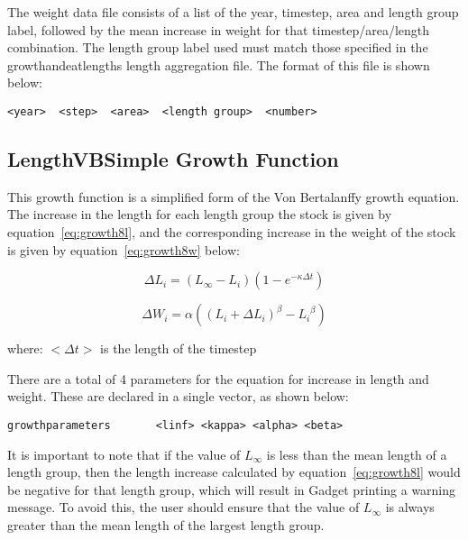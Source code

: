 \documentclass[10pt,twoside]{book}
\begin{document}
The weight data file consists of a list of the year, timestep, area  and length group label, followed by the mean increase in weight for that timestep/area/length combination.  The length group label used must match those specified in the growthandeatlengths length aggregation file.  The format of this file is shown below:

{\small\begin{verbatim}
<year>  <step>  <area>  <length group>  <number>
\end{verbatim}}

\subsection{LengthVBSimple Growth Function}\label{subsec:growth8}
This growth function is a simplified form of the Von Bertalanffy growth equation.  The increase in the length for each length group the stock is given by equation~\ref{eq:growth8l}, and the corresponding increase in the weight of the stock is given by equation~\ref{eq:growth8w} below:

\begin{equation}\label{eq:growth8l}
\Delta L_{i} = \left( L_{\infty} - L_{i} \right) \left( 1 - e^{-\kappa \Delta t} \right)
\end{equation}

\begin{equation}\label{eq:growth8w}
\Delta W_{i} = \alpha \left( \left( L_{i} + \Delta L_{i} \right) ^{\beta} - {L_{i}}^{\beta} \right)
\end{equation}

where:\newline
$<\Delta t>$ is the length of the timestep

\bigskip
There are a total of 4 parameters for the equation for increase in length and weight.  These are declared in a single vector, as shown below:

{\small\begin{verbatim}
growthparameters       <linf> <kappa> <alpha> <beta>
\end{verbatim}}

It is important to note that if the value of $L_{\infty}$ is less than the mean length of a length group, then the length increase calculated by equation~\ref{eq:growth8l} would be negative for that length group, which will result in Gadget printing a warning message.  To avoid this, the user should ensure that the value of $L_{\infty}$ is always greater than the mean length of the largest length group.
\end{document}
